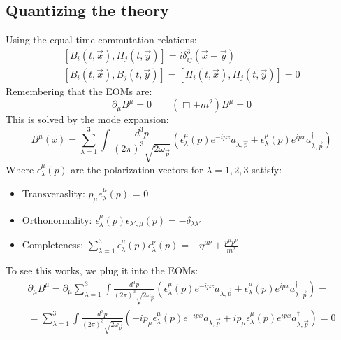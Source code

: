 \documentclass{article}
\begin{document}
\subsection{Quantizing the theory}
Using the equal-time commutation relations:
\begin{equation}
\begin{gathered}
    \left[B_i(t, \vec{x}), \Pi_j(t, \vec{y})\right] =
    i\delta_{ij}^3(\vec{x} - \vec{y})
    \\
    \left[B_i(t, \vec{x}), B_j(t, \vec{y})\right] = 
    \left[\Pi_i(t, \vec{x}), \Pi_j(t, \vec{y})\right] = 
    0
\end{gathered}
\end{equation}
Remembering that the EOMs are:
\begin{equation}
    \partial_\mu B^\mu = 0
    \qquad
    \left(\Box + m^2\right)B^\mu = 0
\end{equation}
This is solved by the mode expansion:
\begin{equation}
    B^\mu(x) = \sum_{\lambda=1}^3 \int\frac{d^3p}{(2\pi)^3\sqrt{2\omega_{\vec{p}}}} \left(
        \epsilon_\lambda^\mu(p)e^{-ipx} a_{\lambda, \vec{p}} +
        \epsilon_\lambda^\mu(p)e^{ipx} a^\dagger_{\lambda, \vec{p}}
    \right)
\end{equation}
Where $\epsilon_\lambda^\mu(p)$ are the polarization vectors for $\lambda = 1,2,3$ satisfy:
\begin{itemize}
    \item Transveraslity: $p_\mu e^\mu_\lambda(p)$ = 0
    \item Orthonormality: $\epsilon^\mu_\lambda(p)\epsilon_{\lambda', \mu}(p) = -\delta_{\lambda\lambda'}$
    \item Completeness: $\sum_{\lambda=1}^3 \epsilon^\mu_\lambda(p)\epsilon^\nu_\lambda(p) = -\eta^{\mu\nu} + \frac{p^\mu p^\nu}{m^2}$
\end{itemize}
To see this works, we plug it into the EOMs:
\begin{equation}
\begin{gathered}
    \partial_\mu B^\mu =
    \partial_\mu \sum_{\lambda=1}^3 \int\frac{d^3p}{(2\pi)^3\sqrt{2\omega_{\vec{p}}}} \left(
        \epsilon_\lambda^\mu(p)e^{-ipx} a_{\lambda, \vec{p}} +
        \epsilon_\lambda^\mu(p)e^{ipx} a^\dagger_{\lambda, \vec{p}}
    \right) = \\ =
    \sum_{\lambda=1}^3 \int\frac{d^3p}{(2\pi)^3\sqrt{2\omega_{\vec{p}}}} \left(
        -ip_\mu \epsilon_\lambda^\mu(p)e^{-ipx} a_{\lambda, \vec{p}} +
        ip_\mu \epsilon_\lambda^\mu(p)e^{ipx} a^\dagger_{\lambda, \vec{p}}
    \right) = 0
\end{gathered}
\end{equation}
\end{document}
